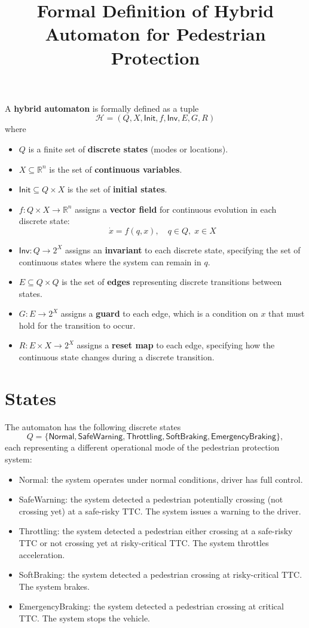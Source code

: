 \documentclass[12pt]{article}
\theoremstyle{definition}
\begin{document}
\title{Formal Definition of Hybrid Automaton for Pedestrian Protection}
\author{}
\date{}
\maketitle

A \textbf{hybrid automaton} is formally defined as a tuple
\[
\mathcal{H} = (Q, X, \mathsf{Init}, f, \mathsf{Inv}, E, G, R)
\]
where
\begin{itemize}
    \item $Q$ is a finite set of \textbf{discrete states} (modes or locations).
    \item $X \subseteq \mathbb{R}^n$ is the set of \textbf{continuous variables}.
    \item $\mathsf{Init} \subseteq Q \times X$ is the set of \textbf{initial states}.
    \item $f: Q \times X \to \mathbb{R}^n$ assigns a \textbf{vector field} for continuous evolution in each discrete state: 
    \[
    \dot{x} = f(q, x), \quad q \in Q, \; x \in X
    \]
    \item $\mathsf{Inv}: Q \to 2^X$ assigns an \textbf{invariant} to each discrete state, specifying the set of continuous states where the system can remain in $q$.
    \item $E \subseteq Q \times Q$ is the set of \textbf{edges} representing discrete transitions between states.
    \item $G: E \to 2^X$ assigns a \textbf{guard} to each edge, which is a condition on $x$ that must hold for the transition to occur.
    \item $R: E \times X \to 2^X$ assigns a \textbf{reset map} to each edge, specifying how the continuous state changes during a discrete transition.
\end{itemize}


\section{States}

The automaton has the following discrete states 
\[Q = \{\mathsf{Normal}, \mathsf{SafeWarning}, \mathsf{Throttling}, \mathsf{SoftBraking}, \mathsf{EmergencyBraking} \},\]
each representing a different operational mode of the pedestrian protection system:
\begin{itemize}
    \item Normal: the system operates under normal conditions, driver has full control.
    \item SafeWarning: the system detected a pedestrian potentially crossing (not crossing yet) at a safe-risky TTC. The system issues a warning to the driver.
    \item Throttling: the system detected a pedestrian either crossing at a safe-risky TTC or not crossing yet at risky-critical TTC. The system throttles acceleration.
    \item SoftBraking: the system detected a pedestrian crossing at risky-critical TTC. The system brakes.
    \item EmergencyBraking: the system detected a pedestrian crossing at critical TTC. The system stops the vehicle.
\end{itemize}
\end{document}

